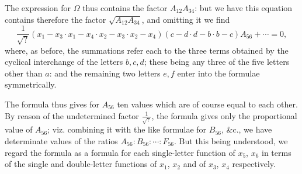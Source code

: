 \documentclass[11pt,a4paper]{book}
\begin{document}
\begin{art}
The expression for $\Omega$ thus contains the factor $A_{12} A_{34}$: but we have this equation contains therefore the factor $\sqrt{A_{12} A_{34}}$, and omitting it we find
\[
\frac{1}{\sqrt{?}} (x_1 - x_3 \cdot x_1 - x_4 \cdot x_2 - x_3 \cdot x_2 - x_4)(c-d \cdot d-b \cdot b-c) A_{56} + \cdots = 0,
\]
where, as before, the summations refer each to the three terms obtained by the cyclical interchange of the letters $b,c,d$; these being any three of the five letters other than $a$: and the remaining two letters $e,f$ enter into the formulae symmetrically.

The formula thus gives for $A_{56}$ ten values which are of course equal to each other. By reason of the undetermined factor $\frac{1}{\sqrt{?}}$, the formula gives only the proportional value of $A_{56}$; viz. combining it with the like formulae for $B_{56}$, \&c., we have determinate values of the ratios $A_{56} : B_{56} : \cdots : F_{56}$. But this being understood, we regard the formula as a formula for each single-letter function of $x_5$, $x_6$ in terms of the single and double-letter functions of $x_1$, $x_2$ and of $x_3$, $x_4$ respectively.
\end{art}
\end{document}
